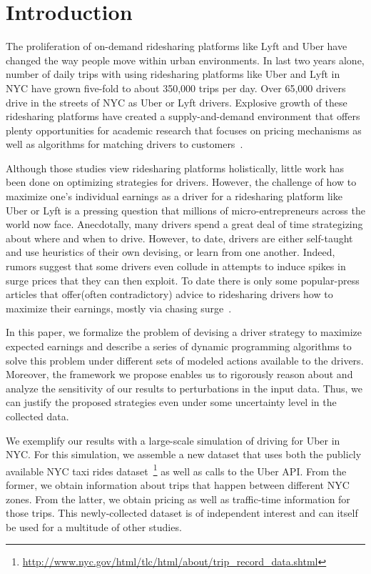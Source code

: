 
\section{Introduction}
\label{sec:introduction}

The proliferation of on-demand ridesharing platforms like Lyft and Uber
have changed the way people move within urban environments. 
In last two years alone, number of daily trips with using ridesharing platforms like 
Uber and Lyft in NYC have grown five-fold to about 350,000 trips per day. Over 65,000 drivers drive in the streets of NYC as Uber or Lyft drivers.
Explosive growth of these ridesharing platforms have created a supply-and-demand environment that offers 
plenty opportunities for academic research that focuses on pricing mechanisms
as well as algorithms for matching drivers to 
customers~\cite{banerjee2015pricing,ozkan2016dynamic}.


Although those studies view ridesharing platforms holistically, little work
has been done on optimizing strategies for drivers. 
However, the challenge of how to maximize one's individual earnings as a driver for a 
ridesharing platform like Uber or Lyft is a pressing question that millions of micro-entrepreneurs 
across the world now face.  Anecdotally, many drivers spend a great deal of time 
strategizing about where and when to drive.  However, to date, drivers are either
self-taught and use heuristics of their own devising, or learn from one another.
Indeed, rumors suggest that some drivers even collude in attempts to induce spikes in surge prices that they can then exploit.
To date there is only  some 
popular-press articles that offer(often contradictory) advice to ridesharing drivers how to maximize their earnings, mostly via chasing surge~\cite{dont,tips}. 

 In this paper, we formalize the problem of devising a driver strategy to maximize expected 
 earnings and describe a series of dynamic programming algorithms to solve this problem
 under different sets of modeled actions available to the drivers. 
 Moreover, the framework we propose enables us to rigorously reason about  and analyze the sensitivity of our results to perturbations in the input data. 
 Thus, we can justify the proposed strategies even under some uncertainty level in the
 collected data. 
  
We exemplify our  results with a large-scale simulation of driving for Uber in NYC. For this simulation, we assemble a new dataset that uses both the publicly available NYC taxi rides 
dataset~\footnote{\url{http://www.nyc.gov/html/tlc/html/about/trip_record_data.shtml}} as well as calls to the Uber API. From the former, we obtain information about trips that happen between different NYC zones. From the latter, we obtain pricing as well as traffic-time information for those trips. This newly-collected dataset is of independent interest and can itself be used for a multitude of other studies.

